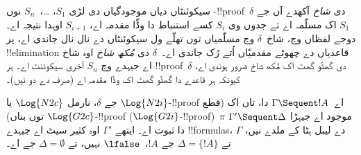 \documentclass[../../../include/open-logic-section]{subfiles}
\begin{document}
سیکوئنٹاں دیاں موجودگیاں دی لڑی $S_1$، \dots،~$S_n$ نوں -!!{proof}~$\delta$ دی \emph{شاخ} آکھدے آں جے $S_1$ اک مسلّمہ اے تے جدوں وی $S_i$ کسے استنباط دا وڈّا مقدمہ اے، $S_{i+1}$ اوہدا نتیجہ اے۔ دوجے لفظاں وچ، شاخ~$\delta$ وچ مسلّمیاں توں تھلّے ول سیکوئنٹاں دے نال نال جاندی اے، پر !!{elimination} قاعدیاں دے چھوٹے مقدمیّاں اُتے رُک جاندی اے۔~$\delta$ دی \emph{مُکھ شاخ} اوہ شاخ اے جیہدے وچ $S_n$ آخری سیکوئنٹ اے۔ ہر !!{proof}~$\delta$ دی گھٹّو گھٹ اک مُکھ شاخ ضرور ہوندی اے، کیونکہ ہر قاعدے دا گھٹّو گھٹ اک وڈّا مقدمہ اے (صرف \Intro{\land} دے دو نیں)۔

\begin{prop}
جے $\delta$، نارمل $\Log{N2c}$ یا $\Log{N2i}$-!!{proof} اے~$\Gamma \Sequent !A$ دا، تاں اک (قطع توں بناں) $\Log{G2c}$-!!{proof} ($\Log{G2i}$-!!{proof})~$\pi$ موجود اے جیہڑا $\Gamma' \Sequent \Delta$ دا ثبوت اے۔ ایتھے $\Gamma'$ اوہ کثیر سیٹ اے جیہدے !!{formula}s، $ \Gamma$ دے لیبل ہٹا کے ملدے نیں، تے $\Delta = \{!A\}$ جے $!A$،~$\lfalse$ نہیں، تے $\Delta = \emptyset$ جے اے۔
\end{prop}
\end{document}
